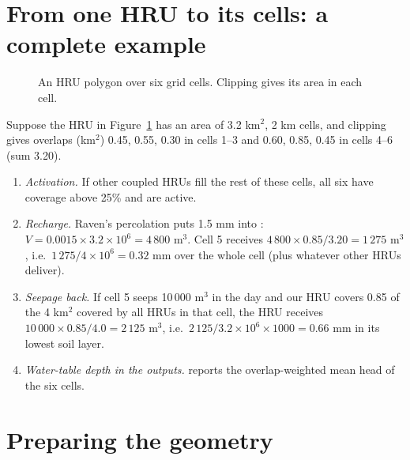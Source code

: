 \section{From one HRU to its cells: a complete example}
\begin{figure}[!htbp]\centering

\caption{An HRU polygon over six grid cells. Clipping gives its area in each cell.}\label{fig:hrucells}
\end{figure}
\begin{example}
Suppose the HRU in Figure~\ref{fig:hrucells} has an  area of 3.2 km$^2$, 2 km cells, and clipping gives overlaps (km$^2$)
0.45, 0.55, 0.30 in cells 1--3 and 0.60, 0.85, 0.45 in cells 4--6 (sum 3.20).
\begin{enumerate}
\item \emph{Activation.} If other coupled HRUs fill the rest of these cells, all six have coverage above 25\% and are active.
\item \emph{Recharge.} Raven's percolation puts 1.5 mm into : $V=0.0015\times3.2\times10^6=4\,800$ m$^3$.
Cell 5 receives $4\,800\times0.85/3.20=1\,275$ m$^3$, i.e.\ $1\,275/4\times10^6=0.32$ mm over the whole cell (plus whatever other
HRUs deliver).
\item \emph{Seepage back.} If cell 5 seeps 10\,000 m$^3$ in the day and our HRU covers 0.85 of the 4 km$^2$ covered by all
HRUs in that cell, the HRU receives $10\,000\times0.85/4.0=2\,125$ m$^3$, i.e.\ $2\,125/3.2\times10^6\times1000=0.66$ mm in its lowest soil layer.
\item \emph{Water-table depth in the outputs.}  reports the overlap-weighted mean head of the six cells.
\end{enumerate}
\end{example}

\section{Preparing the geometry}
